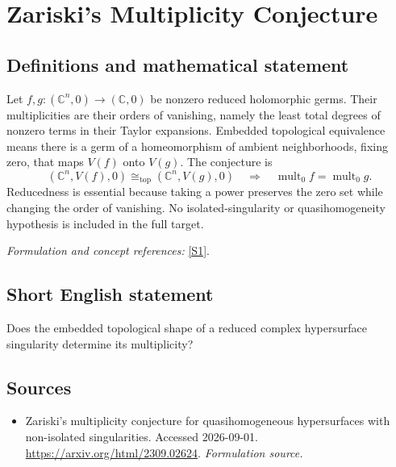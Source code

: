 \documentclass[11pt]{article}
\begin{document}
\section*{\texorpdfstring{Zariski's Multiplicity Conjecture}{Zariski's Multiplicity Conjecture}}\label{30004859}
\subsection{Definitions and mathematical statement}
Let $f,g:({\mathbb{C}}^n,0)\to({\mathbb{C}},0)$ be nonzero reduced holomorphic germs. Their multiplicities are their orders of vanishing, namely the least total degrees of nonzero terms in their Taylor expansions. Embedded topological equivalence means there is a germ of a homeomorphism of ambient neighborhoods, fixing zero, that maps $V(f)$ onto $V(g)$. The conjecture is
\[
 ({\mathbb{C}}^n,V(f),0)\cong_{\mathrm{top}}({\mathbb{C}}^n,V(g),0)
 \quad\Longrightarrow\quad\operatorname{mult}_0f=\operatorname{mult}_0g.
\]
Reducedness is essential because taking a power preserves the zero set while changing the order of vanishing. No isolated-singularity or quasihomogeneity hypothesis is included in the full target.
\par\smallskip\textit{Formulation and concept references:} \href{https://arxiv.org/html/2309.02624}{[S1]}.

\subsection{Short English statement}
Does the embedded topological shape of a reduced complex hypersurface singularity determine its multiplicity?
\subsection{Sources}
\begin{itemize}
\item[S1]Zariski's multiplicity conjecture for quasihomogeneous hypersurfaces with non-isolated singularities. Accessed 2026-09-01.
\url{https://arxiv.org/html/2309.02624}.
\textit{Formulation source.}
\end{itemize}
\end{document}
